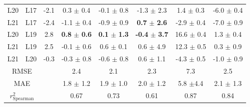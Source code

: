 \begin{table}[h]
\begin{center}
{\begin{tabular}{ c c |c |c|c|c|c|c}
				L20 &  L17 & -2.1 &  0.3 $\pm$ 0.4          & -0.1 $\pm$ 0.8         & -1.3 $\pm$ 2.3                                     &   1.4 $\pm$ 0.3 & -6.0 $\pm$ 0.4 \\
				L21 &  L17 & -2.4 & -1.1 $\pm$ 0.4          & -0.9 $\pm$ 0.9         &\textbf{0.7} $\pm$ \textbf{2.6}                     &  -2.9 $\pm$ 0.4 & -7.0 $\pm$ 0.9 \\
				L20 &  L19 & 2.8  &\textbf{0.8} $\pm$ \textbf{0.6}   & \textbf{0.1} $\pm$ \textbf{1.3} & \textbf{-0.4} $\pm$ \textbf{3.7} &  16.6 $\pm$ 0.4 &  1.3 $\pm$ 0.4 \\
				L21 &  L19 & 2.5  & -0.1 $\pm$ 0.6         &  0.6 $\pm$ 0.1         &  0.6 $\pm$ 4.9                                      &  12.3 $\pm$ 0.5 &  0.3 $\pm$ 0.9 \\
				L21 &  L20 & -0.3 & -0.3 $\pm$ 0.8         & -0.6 $\pm$ 0.8         &  0.6 $\pm$ 1.1                                    &  -4.3 $\pm$ 0.5 & -1.0 $\pm$ 0.9 \\ 
				\hline
				\multicolumn{2}{c|}{RMSE} &                    & 2.4            & 2.1           &  2.3          & 7.3          & 2.5 \\
				\multicolumn{2}{c|}{MAE} &                     & 1.8 $\pm$ 1.2 & 1.9 $\pm$ 1.0 & 2.0 $\pm$ 1.2 & 5.8 $\pm$4.4 & 2.1 $\pm$ 1.3 \\
				\multicolumn{2}{c|}{$r^2_{\text{Spearman}}$} & & 0.67           & 0.73          & 0.61          & 0.87          & 0.84 \\
			\end{tabular}
		}
	\end{center}
	\label{SItab: RE-EDS_FE_RingCycleOpening_ddF}
\end{table}

% 
%






